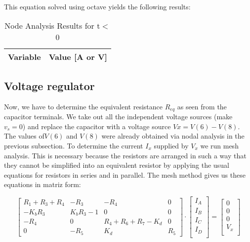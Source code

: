 This equation solved using octave yields the following results:

\begin{table}[H]
    \centering
    \begin{tabular}{|l|r|}
      \hline    
      {\bf Variable} & {\bf Value [A or V]} \\ \hline
    \end{tabular}
    \caption{Node Analysis Results for t$<$0}
    \label{tab:nodeanalysis}
  \end{table}
  
  
\subsection{Voltage regulator}
Now,  we have to determine the equivalent resistance $R_{eq}$ as seen from the capacitor terminals. We take out all the independent voltage sources (make $v_s=0$) and replace the capacitor with a voltage source $Vx= V(6)-V(8)$. The values of$ V(6)$ and $V(8)$ were already obtained via nodal analysis in the previous subsection. To determine the current $I_x$ supplied by $V_x$ we run mesh analysis. This is necessary because the resistors are arranged in such a way that they cannot be simplified into an equivalent resistor by applying the usual equations for resistors in series and in parallel. The mesh method gives us these equations in matriz form:


\begin{equation}\label{eq:matrixeq2}
\begin{bmatrix}
 R_1+R_3+R_4 & -R_3 & -R_4 & 0\\
    -K_bR_3 &  K_bR_3-1 & 0 & 0\\ 
    -R_4 & 0 & R_4+R_6+R_7-K_d & 0\\
    0 & -R_5 & K_d & R_5 
\end{bmatrix}
\cdot
\begin{bmatrix}
I_A\\
I_B \\
I_C \\
I_D \\

    \end{bmatrix}
=
    \begin{bmatrix}
0 \\
0 \\
0 \\
V_x \\

    \end{bmatrix}
  \end{equation}

